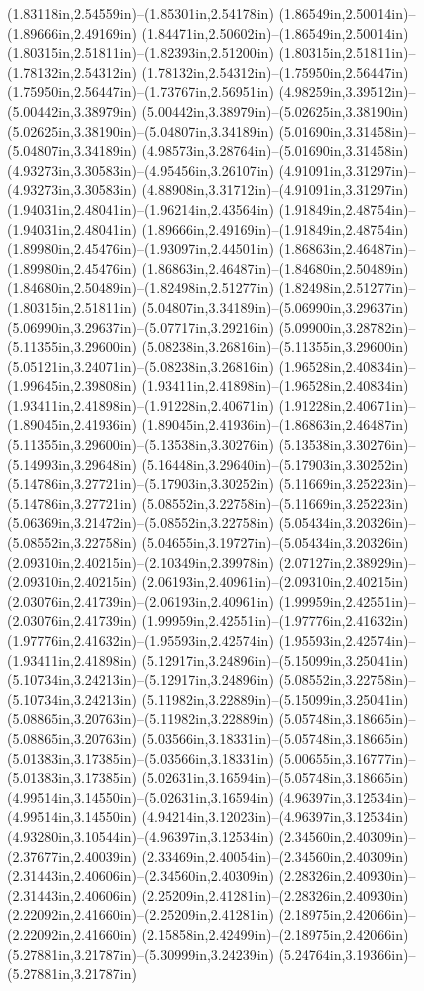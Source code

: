 (1.83118in,2.54559in)--(1.85301in,2.54178in) (1.86549in,2.50014in)--(1.89666in,2.49169in) (1.84471in,2.50602in)--(1.86549in,2.50014in) (1.80315in,2.51811in)--(1.82393in,2.51200in) (1.80315in,2.51811in)--(1.78132in,2.54312in) (1.78132in,2.54312in)--(1.75950in,2.56447in) (1.75950in,2.56447in)--(1.73767in,2.56951in) (4.98259in,3.39512in)--(5.00442in,3.38979in) (5.00442in,3.38979in)--(5.02625in,3.38190in) (5.02625in,3.38190in)--(5.04807in,3.34189in) (5.01690in,3.31458in)--(5.04807in,3.34189in) (4.98573in,3.28764in)--(5.01690in,3.31458in) (4.93273in,3.30583in)--(4.95456in,3.26107in) (4.91091in,3.31297in)--(4.93273in,3.30583in) (4.88908in,3.31712in)--(4.91091in,3.31297in) (1.94031in,2.48041in)--(1.96214in,2.43564in) (1.91849in,2.48754in)--(1.94031in,2.48041in) (1.89666in,2.49169in)--(1.91849in,2.48754in) (1.89980in,2.45476in)--(1.93097in,2.44501in) (1.86863in,2.46487in)--(1.89980in,2.45476in) (1.86863in,2.46487in)--(1.84680in,2.50489in) (1.84680in,2.50489in)--(1.82498in,2.51277in) (1.82498in,2.51277in)--(1.80315in,2.51811in) (5.04807in,3.34189in)--(5.06990in,3.29637in) (5.06990in,3.29637in)--(5.07717in,3.29216in) (5.09900in,3.28782in)--(5.11355in,3.29600in) (5.08238in,3.26816in)--(5.11355in,3.29600in) (5.05121in,3.24071in)--(5.08238in,3.26816in) (1.96528in,2.40834in)--(1.99645in,2.39808in) (1.93411in,2.41898in)--(1.96528in,2.40834in) (1.93411in,2.41898in)--(1.91228in,2.40671in) (1.91228in,2.40671in)--(1.89045in,2.41936in) (1.89045in,2.41936in)--(1.86863in,2.46487in) (5.11355in,3.29600in)--(5.13538in,3.30276in) (5.13538in,3.30276in)--(5.14993in,3.29648in) (5.16448in,3.29640in)--(5.17903in,3.30252in) (5.14786in,3.27721in)--(5.17903in,3.30252in) (5.11669in,3.25223in)--(5.14786in,3.27721in) (5.08552in,3.22758in)--(5.11669in,3.25223in) (5.06369in,3.21472in)--(5.08552in,3.22758in) (5.05434in,3.20326in)--(5.08552in,3.22758in) (5.04655in,3.19727in)--(5.05434in,3.20326in) (2.09310in,2.40215in)--(2.10349in,2.39978in) (2.07127in,2.38929in)--(2.09310in,2.40215in) (2.06193in,2.40961in)--(2.09310in,2.40215in) (2.03076in,2.41739in)--(2.06193in,2.40961in) (1.99959in,2.42551in)--(2.03076in,2.41739in) (1.99959in,2.42551in)--(1.97776in,2.41632in) (1.97776in,2.41632in)--(1.95593in,2.42574in) (1.95593in,2.42574in)--(1.93411in,2.41898in) (5.12917in,3.24896in)--(5.15099in,3.25041in) (5.10734in,3.24213in)--(5.12917in,3.24896in) (5.08552in,3.22758in)--(5.10734in,3.24213in) (5.11982in,3.22889in)--(5.15099in,3.25041in) (5.08865in,3.20763in)--(5.11982in,3.22889in) (5.05748in,3.18665in)--(5.08865in,3.20763in) (5.03566in,3.18331in)--(5.05748in,3.18665in) (5.01383in,3.17385in)--(5.03566in,3.18331in) (5.00655in,3.16777in)--(5.01383in,3.17385in) (5.02631in,3.16594in)--(5.05748in,3.18665in) (4.99514in,3.14550in)--(5.02631in,3.16594in) (4.96397in,3.12534in)--(4.99514in,3.14550in) (4.94214in,3.12023in)--(4.96397in,3.12534in) (4.93280in,3.10544in)--(4.96397in,3.12534in) (2.34560in,2.40309in)--(2.37677in,2.40039in) (2.33469in,2.40054in)--(2.34560in,2.40309in) (2.31443in,2.40606in)--(2.34560in,2.40309in) (2.28326in,2.40930in)--(2.31443in,2.40606in) (2.25209in,2.41281in)--(2.28326in,2.40930in) (2.22092in,2.41660in)--(2.25209in,2.41281in) (2.18975in,2.42066in)--(2.22092in,2.41660in) (2.15858in,2.42499in)--(2.18975in,2.42066in) (5.27881in,3.21787in)--(5.30999in,3.24239in) (5.24764in,3.19366in)--(5.27881in,3.21787in) 